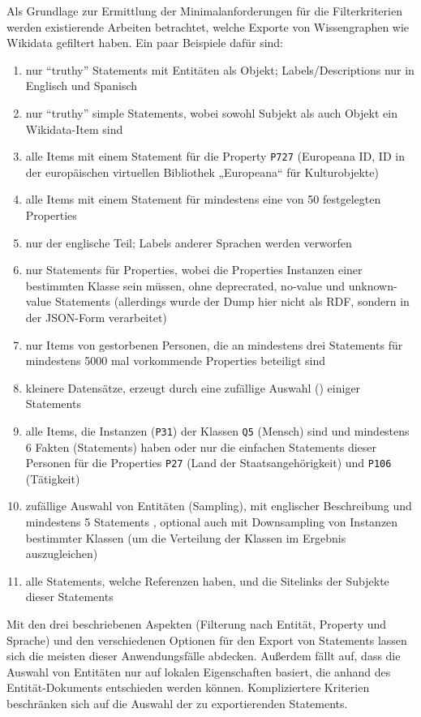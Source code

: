 Als Grundlage zur Ermittlung der Minimalanforderungen für die Filterkriterien werden existierende Arbeiten betrachtet, welche Exporte von Wissengraphen wie Wikidata gefiltert haben.
Ein paar Beispiele dafür sind:
\begin{enumerate}[label=\arabic*)]
  \item nur "`truthy"' Statements mit Entitäten als Objekt; Labels/Descriptions nur in Englisch und Spanisch \cite{usage-grafa}
  \item nur "`truthy"' simple Statements, wobei sowohl Subjekt als auch Objekt ein Wikidata-Item sind \cite{usage-wembedder}
  \item alle Items mit einem Statement für die Property \verb|P727| (Europeana ID, ID in der europäischen virtuellen Bibliothek „Europeana“ für Kulturobjekte) \cite{usage-europeana}
  \item alle Items mit einem Statement für mindestens eine von 50 festgelegten Properties \cite{usage-narratives} 
  \item nur der englische Teil; Labels anderer Sprachen werden verworfen \cite{usage-web-tables} 
  \item nur Statements für Properties, wobei die Properties Instanzen einer bestimmten Klasse sein müssen, ohne deprecrated, no-value und unknown-value Statements \cite{usage-implicational-knowledge} (allerdings wurde der Dump hier nicht als RDF, sondern in der JSON-Form verarbeitet)
  \item nur Items von gestorbenen Personen, die an mindestens drei Statements für mindestens 5000 mal vorkommende Properties beteiligt sind \cite{usage-learning-structured-embeddings}
  \item kleinere Datensätze, erzeugt durch eine zufällige Auswahl () einiger Statements \cite{usage-sparql-benchmark}
  \item alle Items, die Instanzen (\verb|P31|) der Klassen \verb|Q5| (Mensch) sind und mindestens 6 Fakten (Statements) haben \cite{usage-one-sentence} oder nur die einfachen Statements dieser Personen für die Properties \verb|P27| (Land der Staatsangehörigkeit) und \verb|P106| (Tätigkeit) \cite{usage-person-networks}
  \item zufällige Auswahl von Entitäten (Sampling), mit englischer Beschreibung und mindestens 5 Statements \cite{usage-generate-entity-type-desc}, optional auch mit Downsampling von Instanzen bestimmter Klassen (um die Verteilung der Klassen im Ergebnis auszugleichen) \cite{usage-synthesize-entity-desc}
  \item alle Statements, welche Referenzen haben, und die Sitelinks der Subjekte dieser Statements \cite{wd-wk-common-references}
\end{enumerate}
Mit den drei beschriebenen Aspekten (Filterung nach Entität, Property und Sprache) und den verschiedenen Optionen für den Export von Statements lassen sich die meisten dieser Anwendungsfälle abdecken.
Außerdem fällt auf, dass die Auswahl von Entitäten nur auf lokalen Eigenschaften basiert, die anhand des Entität-Dokuments entschieden werden können. 
Kompliziertere Kriterien beschränken sich auf die Auswahl der zu exportierenden Statements.

